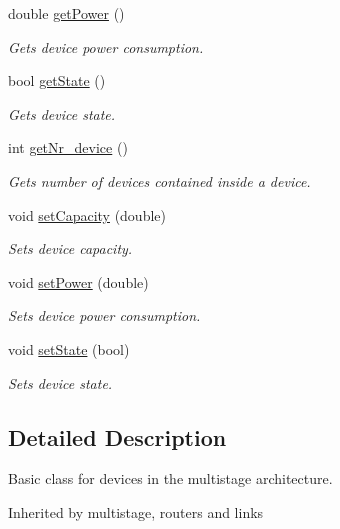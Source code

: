 \begin{DoxyCompactItemize}
double \hyperlink{classdevice_af7b6d78ad457ad75a5f3ed2b40266017}{get\-Power} ()
\begin{DoxyCompactList}\small\item\em \-Gets device power consumption. \end{DoxyCompactList}\item 
bool \hyperlink{classdevice_a287ef719b436c552cb78f498869ce590}{get\-State} ()
\begin{DoxyCompactList}\small\item\em \-Gets device state. \end{DoxyCompactList}\item 
int \hyperlink{classdevice_aba1387d01eac1fa58a5386395b368384}{get\-Nr\-\_\-device} ()
\begin{DoxyCompactList}\small\item\em \-Gets number of devices contained inside a device. \end{DoxyCompactList}\item 
void \hyperlink{classdevice_a66b66e2bce25b091d651ee6336f6f40e}{set\-Capacity} (double)
\begin{DoxyCompactList}\small\item\em \-Sets device capacity. \end{DoxyCompactList}\item 
void \hyperlink{classdevice_a43b8093ad785d5b5787751a7ede0ae73}{set\-Power} (double)
\begin{DoxyCompactList}\small\item\em \-Sets device power consumption. \end{DoxyCompactList}\item 
void \hyperlink{classdevice_a8479767364d2d7a6e349552eb6bae023}{set\-State} (bool)
\begin{DoxyCompactList}\small\item\em \-Sets device state. \end{DoxyCompactList}\end{DoxyCompactItemize}


\subsection{\-Detailed \-Description}
\-Basic class for devices in the multistage architecture. 

\-Inherited by multistage, routers and links 

